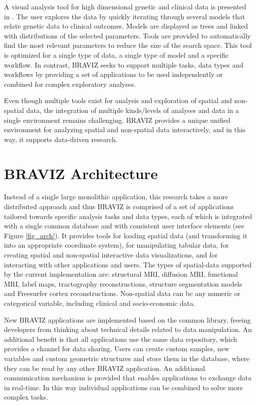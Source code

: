 \documentclass[twocolumn]{svjour3}
\begin{document}
A visual analysis tool for high dimensional genetic and clinical data is presented in \cite{hinterberg_peax:_2014}. The user explores the data by quickly iterating through several models that relate genetic data to clinical outcomes. Models are displayed as trees and linked with distributions of the selected parameters. Tools are provided to automatically find the most relevant parameters to reduce the size of the search space. This tool is optimized for a single type of data, a single type of model and a specific workflow. In contrast, BRAVIZ seeks to support multiple tasks, data types and workflows by providing a set of  applications to be used independently or combined for complex exploratory analyses.
	
Even though multiple tools  exist for analysis and exploration of spatial and non-spatial data, the integration of multiple kinds/levels of analyses and data in a single environment remains challenging. BRAVIZ provides a unique unified environment for analyzing spatial and non-spatial data interactively, and in this way, it supports data-driven research.

\section{BRAVIZ Architecture}

Instead of a single large monolithic application, this research takes a more distributed approach and thus BRAVIZ is comprised of a set of applications tailored towards specific analysis tasks and data types, each of which is integrated with a single common database and with consistent user interface elements (see Figure \ref{fig_arch}). It provides tools for loading spatial data (and transforming it into an appropriate coordinate system), for manipulating tabular data, for creating spatial and non-spatial interactive data visualizations, and for interacting with other applications and users. The types of spatial-data supported by the current implementation are: structural MRI, diffusion MRI, functional MRI, label maps, tractography reconstructions, structure segmentation models and Freesurfer cortex reconstructions. Non-spatial data can be any numeric or categorical variable, including clinical and socio-economic data.

New BRAVIZ applications are implemented based on the common library, freeing developers from thinking about technical details related to data manipulation. An additional benefit is that all applications use the same data repository, which provides a channel for data sharing. Users can create custom samples, new variables and custom geometric structures and store them in the database, where they can be read by any other BRAVIZ application. An additional communication mechanism is provided that enables applications to exchange data in real-time. In this way individual applications can be combined to solve more complex tasks.
\end{document}
